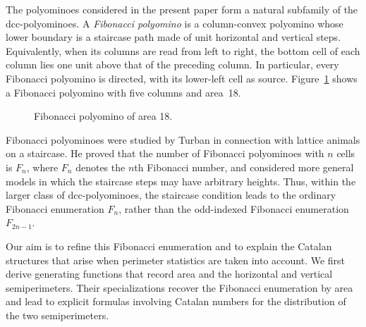 \documentclass[12pt]{amsart}
\theoremstyle{plain}
\theoremstyle{definition}
\def\x{\hspace{3ex}}    %
\def\y{\hspace{2.45ex}}  %
\begin{document}
The polyominoes considered in the present paper form a natural subfamily of the dcc-polyominoes. A \emph{Fibonacci polyomino} is a column-convex polyomino whose lower boundary is a staircase
path made of unit horizontal and vertical steps. Equivalently, when its columns are read from left to right, the bottom cell of each column lies one unit above that of the preceding column. In particular, every Fibonacci polyomino is directed, with its lower-left cell as source. Figure~\ref{Ex1} shows a Fibonacci polyomino with five columns and area~18.


\begin{figure}[ht!]
\centering
\centering
{}

\caption{Fibonacci polyomino of area 18.}\label{Ex1}
\end{figure}

Fibonacci polyominoes were studied by Turban \cite{Turban1,Turban2} in connection with lattice animals on a staircase. He proved that the number of Fibonacci polyominoes with $n$ cells is $F_n$, where $F_n$ denotes the $n$th Fibonacci number, and considered more general models in which the staircase steps may have arbitrary heights. Thus, within the larger class of dcc-polyominoes, the staircase condition leads to the ordinary Fibonacci enumeration $F_n$, rather than the odd-indexed Fibonacci enumeration $F_{2n-1}$.

Our aim is to refine this Fibonacci enumeration and to explain the Catalan structures that arise when perimeter statistics are taken into
account. We first derive generating functions that record area and the horizontal and vertical semiperimeters. Their specializations recover
the Fibonacci enumeration by area and lead to explicit formulas involving Catalan numbers for the distribution of the two semiperimeters.
\end{document}
